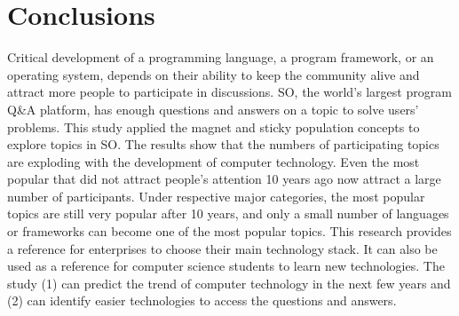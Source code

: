 \documentclass[english,preprint,JIP,technote]{ipsj}
\begin{document}


\section{Conclusions}
Critical development of a programming language, a program framework, or an operating system, depends on their ability to keep the community alive and attract more people to participate in discussions. SO, the world’s largest program Q\&A platform, has enough questions and answers on a topic to solve users’ problems. This study applied the magnet and sticky population concepts to explore topics in SO. The results show that the numbers of participating topics are exploding with the development of computer technology. Even the most popular that did not attract people’s attention 10 years ago now attract a large number of participants. Under respective major categories, the most popular topics are still very popular after 10 years, and only a small number of languages or frameworks can become one of the most popular topics. This research provides a reference for enterprises to choose their main technology stack. It can also be used as a reference for computer science students to learn new technologies. The study (1) can predict the trend of computer technology in the next few years and (2) can identify easier technologies to access the questions and answers.






\end{document}
